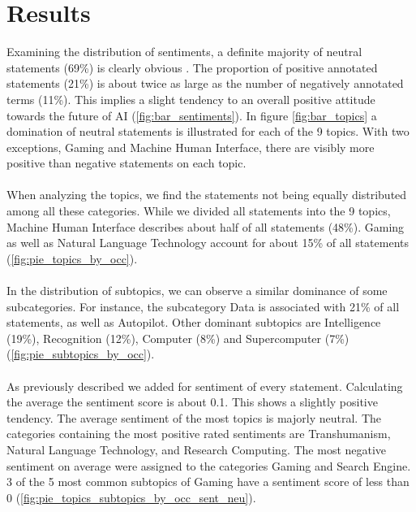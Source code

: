 \section{Results}
\label{results}
Examining the distribution of sentiments, a definite majority of neutral statements  (69\%) is clearly obvious . The proportion of positive annotated statements (21\%) is about twice as large as the number of negatively annotated terms (11\%). This implies a slight tendency to an overall positive attitude towards the future of AI (\autoref{fig:bar_sentiments}). In figure \ref{fig:bar_topics} a domination of neutral statements is illustrated for each of the 9 topics. With two exceptions, Gaming and Machine Human Interface, there are visibly more positive than negative statements on each topic. 
\\
\\
When analyzing the topics, we find the statements not being equally distributed among all these categories. While we divided all statements into the 9 topics, Machine Human Interface describes about half of all statements (48\%). Gaming as well as Natural Language Technology account for about 15\% of all statements (\autoref{fig:pie_topics_by_occ}). 
\\
\\
In the distribution of subtopics, we can observe a similar dominance of some subcategories. For instance, the subcategory Data is associated with 21\% of all statements, as well as Autopilot. Other dominant subtopics are Intelligence (19\%), Recognition (12\%), Computer (8\%) and Supercomputer (7\%) (\autoref{fig:pie_subtopics_by_occ}). 
\\
\\
As previously described we added for sentiment of every statement. Calculating the average the sentiment score is about 0.1. This shows a slightly positive tendency. The average sentiment of the most topics is majorly neutral. The categories containing the most positive rated sentiments are Transhumanism, Natural Language Technology, and Research Computing. The most negative sentiment on average were assigned to the categories Gaming and Search Engine. 3 of the 5 most common subtopics of Gaming have a sentiment score of less than 0 (\autoref{fig:pie_topics_subtopics_by_occ_sent_neu}). 
